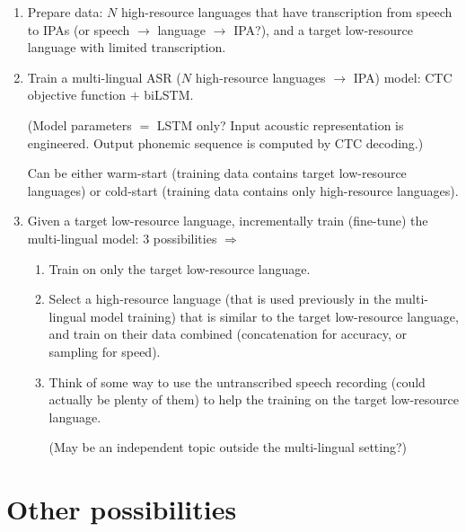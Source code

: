 \documentclass{article}
\begin{document}
\begin{enumerate}

\item Prepare data: $N$ high-resource languages that have transcription from speech to IPAs (or speech $\rightarrow$ language $\rightarrow$ IPA?), and a target low-resource language with limited transcription.
	
\item Train a multi-lingual ASR ($N$ high-resource languages $\rightarrow$ IPA) model: CTC objective function $+$ biLSTM.

(Model parameters $=$ LSTM only? Input acoustic representation is engineered. Output phonemic sequence is computed by CTC decoding.)

Can be either warm-start (training data contains target low-resource languages) or cold-start (training data contains only high-resource languages).

\item Given a target low-resource language, incrementally train (fine-tune) the multi-lingual model: 3 possibilities $\Rightarrow$

	\begin{enumerate}
	
	\item Train on only the target low-resource language.
	
	\item Select a high-resource language (that is used previously in the multi-lingual model training) that is similar to the target low-resource language, and train on their data combined (concatenation for accuracy, or sampling for speed).
	
	\item Think of some way to use the untranscribed speech recording (could actually be plenty of them) to help the training on the target low-resource language.
	
	(May be an independent topic outside the multi-lingual setting?)
	
	\end{enumerate}

\end{enumerate}




\section{Other possibilities}
\end{document}
